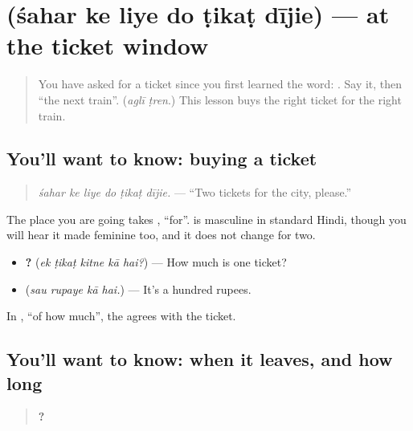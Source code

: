 \section[\texorpdfstring{\hi{शहर} \hi{के} \hi{लिए} \hi{दो} … (śahar ke liye do …)}{शहर के लिए दो … (śahar ke liye do …)}]{      (śahar ke liye do ṭikaṭ dījie) — at the ticket window}

\label{lesson:HI-C283-ektikat}



\begin{quote}
You have asked for a ticket since you first learned the word: \textbf{  }. Say it, then \textquotedblleft{}the next train\textquotedblright{}. (\emph{aglī ṭren}.) This lesson buys the right ticket for the right train.
\end{quote}

\subsection*{You'll want to know: buying a ticket}
\begin{quote}
\textbf{     }
\end{quote}

\begin{quote}
\emph{śahar ke liye do ṭikaṭ dījie.} — \textquotedblleft{}Two tickets for the city, please.\textquotedblright{}
\end{quote}

The place you are going takes \textbf{ }, \textquotedblleft{}for\textquotedblright{}. \textbf{} is masculine in standard Hindi, though you will hear it made feminine too, and it does not change for two.

\begin{itemize}
\raggedright
  \item \textbf{    ?} (\emph{ek ṭikaṭ kitne kā hai?}) — How much is one ticket?
  \item \textbf{   } (\emph{sau rupaye kā hai.}) — It's a hundred rupees.
\end{itemize}

In \textbf{ }, \textquotedblleft{}of how much\textquotedblright{}, the \textbf{} agrees with the ticket.

\subsection*{You'll want to know: when it leaves, and how long}
\begin{quote}
\textbf{    ?}
\end{quote}

